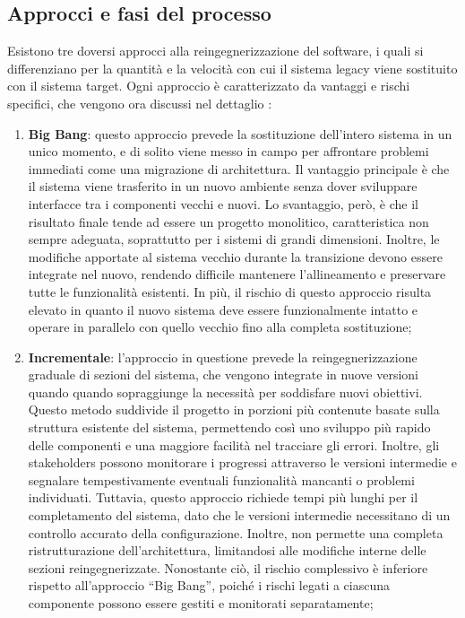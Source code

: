 \subsection{Approcci e fasi del processo}
Esistono tre doversi approcci alla reingegnerizzazione del software, i quali si differenziano per la quantità e la velocità con cui il sistema legacy viene sostituito con il sistema target. Ogni approccio è caratterizzato da vantaggi e rischi specifici, che vengono ora discussi nel dettaglio \cite{Majthoub2018,rosenberg1996software}:
\begin{enumerate}
  \item \textbf{Big Bang}: questo approccio prevede la sostituzione dell'intero sistema in un unico momento, e di solito viene messo in campo per affrontare problemi immediati come una migrazione di architettura. Il vantaggio principale è che il sistema viene trasferito in un nuovo ambiente senza dover sviluppare interfacce tra i componenti vecchi e nuovi. Lo svantaggio, però, è che il risultato finale tende ad essere un progetto monolitico, caratteristica non sempre adeguata, soprattutto per i sistemi di grandi dimensioni. Inoltre, le modifiche apportate al sistema vecchio durante la transizione devono essere integrate nel nuovo, rendendo difficile mantenere l'allineamento e preservare tutte le funzionalità esistenti. In più, il rischio di questo approccio risulta elevato in quanto il nuovo sistema deve essere funzionalmente intatto e operare in parallelo con quello vecchio fino alla completa sostituzione;

  \item \textbf{Incrementale}: l'approccio in questione prevede la reingegnerizzazione graduale di sezioni del sistema, che vengono integrate in nuove versioni quando quando sopraggiunge la necessità per soddisfare nuovi obiettivi. Questo metodo suddivide il progetto in porzioni più contenute basate sulla struttura esistente del sistema, permettendo così uno sviluppo più rapido delle componenti e una maggiore facilità nel tracciare gli errori. Inoltre, gli stakeholders possono monitorare i progressi attraverso le versioni intermedie e segnalare tempestivamente eventuali funzionalità mancanti o problemi individuati. Tuttavia, questo approccio richiede tempi più lunghi per il completamento del sistema, dato che le versioni intermedie necessitano di un controllo accurato della configurazione. Inoltre, non permette una completa ristrutturazione dell'architettura, limitandosi alle modifiche interne delle sezioni reingegnerizzate. Nonostante ciò, il rischio complessivo è inferiore rispetto all'approccio ``Big Bang'', poiché i rischi legati a ciascuna componente possono essere gestiti e monitorati separatamente;


\end{enumerate}
